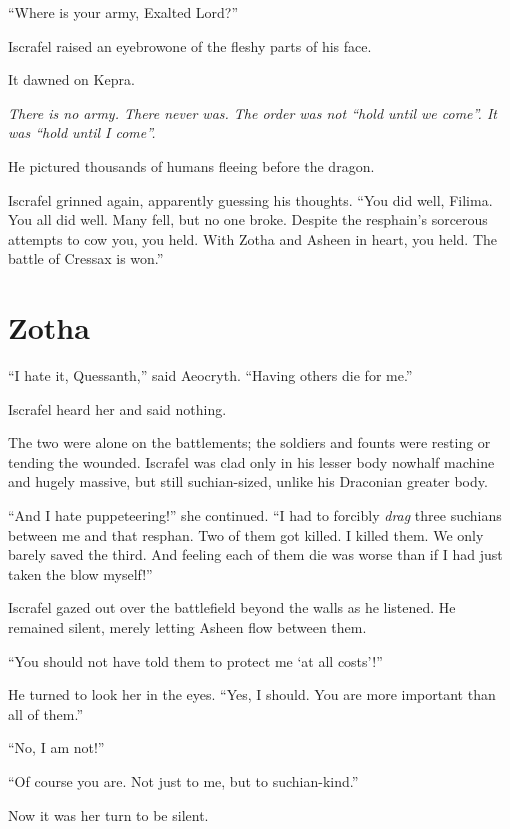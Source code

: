 \documentclass
  [a4paper,
   12pt,
   oneside
  ]%
  {article}
\begin{document}
``Where is your army, Exalted Lord?''

Iscrafel raised an eyebrow\dash{}one of the fleshy parts of his face.

It dawned on Kepra. 

\emph{%
    There is no army. There never was. The order was not ``hold until we come''. It was ``hold until I come''.%
}

He pictured thousands of humans fleeing before the dragon.

Iscrafel grinned again, apparently guessing his thoughts. 
``You did well, Filima. You all did well. Many fell, but no one broke. Despite the resphain's sorcerous attempts to cow you, you held. With Zotha and Asheen in heart, you held. The battle of Cressax is won.''



\section{Zotha}
``I hate it, Quessanth,'' said Aeocryth. ``Having others die for me.''

Iscrafel heard her and said nothing. 

The two were alone on the battlements; the soldiers and founts were resting or tending the wounded.
Iscrafel was clad only in his lesser body now\dash{}half machine and hugely massive, but still suchian-sized, unlike his Draconian greater body. 

``And I hate puppeteering!'' she continued. 
``I had to forcibly \emph{drag} three suchians between me and that resphan. Two of them got killed. I killed them. We only barely saved the third. And feeling each of them die was worse than if I had just taken the blow myself!''

Iscrafel gazed out over the battlefield beyond the walls as he listened. 
He remained silent, merely letting Asheen flow between them. 

``You should not have told them to protect me `at all costs'!''

He turned to look her in the eyes.
``Yes, I should. You are more important than all of them.''

``No, I am not!''

``Of course you are. Not just to me, but to suchian-kind.''

Now it was her turn to be silent. 
\end{document}
